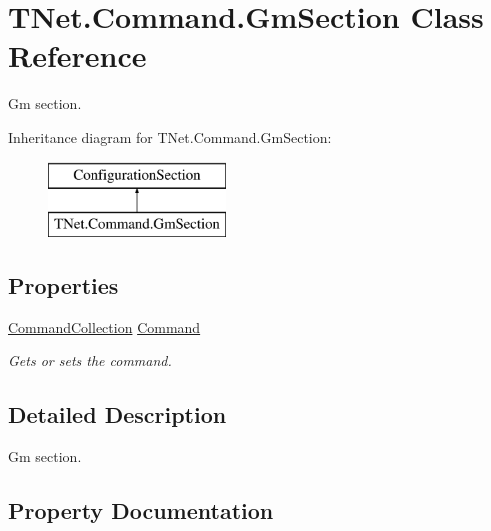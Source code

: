 \hypertarget{class_t_net_1_1_command_1_1_gm_section}{}\section{T\+Net.\+Command.\+Gm\+Section Class Reference}
\label{class_t_net_1_1_command_1_1_gm_section}


Gm section.  


Inheritance diagram for T\+Net.\+Command.\+Gm\+Section\+:\begin{figure}[H]
\begin{center}
\leavevmode
\includegraphics[height=2.000000cm]{class_t_net_1_1_command_1_1_gm_section}
\end{center}
\end{figure}
\subsection*{Properties}
\begin{DoxyCompactItemize}
\item 
\mbox{\hyperlink{class_t_net_1_1_command_1_1_command_collection}{Command\+Collection}} \mbox{\hyperlink{class_t_net_1_1_command_1_1_gm_section_aa9c61767d60af29c1933734031a5d8ee}{Command}}
\begin{DoxyCompactList}\small\item\em Gets or sets the command. \end{DoxyCompactList}\end{DoxyCompactItemize}


\subsection{Detailed Description}
Gm section. 



\subsection{Property Documentation}
\mbox{\label{class_t_net_1_1_command_1_1_gm_section_aa9c61767d60af29c1933734031a5d8ee}} 
